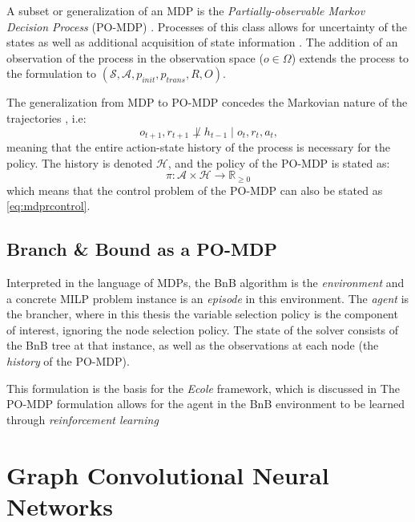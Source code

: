A subset or generalization of an \gls{MDP} is the \textit{Partially-observable Markov Decision Process }(\gls{PO-MDP}) \cite{monahan1982state}. Processes of this class allows for uncertainty of the states as well as additional acquisition of state information \cite{monahan1982state}.
The addition of an observation of the process in the observation space ($o \in \Omega $) extends the process to the formulation to $ (\mathcal{S}, \mathcal{A}, p_{init}, p_{trans}, R, O)$. 

The generalization from \gls{MDP} to \gls{PO-MDP} concedes the Markovian nature of the trajectories \cite{prouvost2020ecole}, i.e:
\begin{equation}
    o_{t+1},r_{t+1} \not \perp   h_{t-1} \mid o_t,r_t,a_t
\text{,}
\end{equation}
meaning that the entire action-state history of the process is necessary for the policy. The history is denoted $\mathcal{H}$, and the policy of the \gls{PO-MDP} is stated as:
\begin{equation}
    \pi:\mathcal{A} \times \mathcal{H} \to \mathbb{R}_{\geq 0}
\end{equation}
which means that the control problem of the \gls{PO-MDP} can also be stated as \cref{eq:mdprcontrol}.

\subsection{Branch \& Bound as a \gls{PO-MDP}}

Interpreted in the language of \gls{MDP}s, the \gls{BnB} algorithm is the \textit{environment} and a concrete \gls{MILP} problem instance is an \textit{episode} in this environment. The \textit{agent} is the brancher, where in this thesis the variable selection policy is the component of interest, ignoring the node selection policy. The state of the solver consists of the \gls{BnB} tree at that instance, as well as the observations at each node (the \textit{history} of the \gls{PO-MDP}).

This formulation is the basis for the \textit{Ecole} framework, which is discussed in 
The \gls{PO-MDP} formulation allows for the agent in the \gls{BnB} environment to be learned through \textit{reinforcement learning}






\section{Graph Convolutional Neural Networks }


